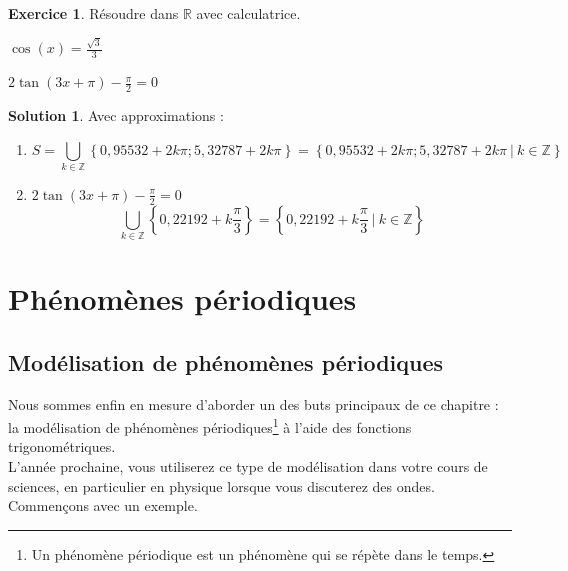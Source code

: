 \documentclass[a4paper,fontsize=13pt]{scrreprt}
\theoremstyle{plain}
\theoremstyle{definition}
\newtheorem{exo}[subsection]{Exercice}
\newtheorem*{solu}{Solution}
\newcommand{\zz}{\mathbb{Z}}
\newcommand{\rr}{\mathbb{R}}
\begin{document}
\begin{exo}
Résoudre dans $\rr$ avec calculatrice.
\begin{enumerate}
\begin{multicols}{2}
\item $\cos(x)=\frac{\sqrt{3}}{3}$
\item $2\tan(3x+\pi)-\frac{\pi}{2}=0$
\end{multicols}
\end{enumerate}
\end{exo}

\begin{solu}
Avec approximations :
\begin{enumerate}
\item $$S=\underset{k\in\zz}\bigcup \left\{0,95532+2k\pi ; 5,32787+2k\pi \right\} = \left\{0,95532+2k\pi ; 5,32787+2k\pi ~|~ k \in \zz \right\}$$
\item $2\tan(3x+\pi)-\frac{\pi}{2}=0$
$$\underset{k\in\zz}\bigcup \left\{0,22192+k\frac{\pi}{3} \right\} = \left\{0,22192+k\frac{\pi}{3} ~|~ k \in \zz \right\}$$
\end{enumerate}
\end{solu}

\chapter{Phénomènes périodiques}

\section{Modélisation de phénomènes périodiques}

Nous sommes enfin en mesure d'aborder un des buts principaux de ce chapitre : la modélisation de phénomènes périodiques\footnote{Un phénomène périodique est un phénomène qui se répète dans le temps.} à l'aide des fonctions trigonométriques. \\
L'année prochaine, vous utiliserez ce type de modélisation dans votre cours de sciences, en particulier en physique lorsque vous discuterez des ondes. \\
Commençons avec un exemple.
\end{document}
